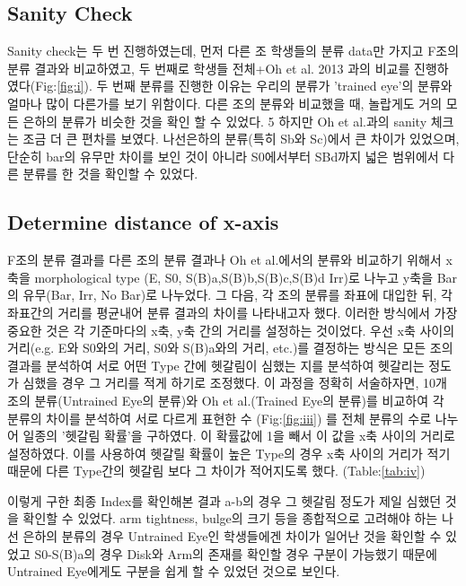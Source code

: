 \documentclass[a4paper,11pt]{article}
\begin{document}
\subsection{Sanity Check}


Sanity check는 두 번 진행하였는데, 먼저 다른 조 학생들의 분류 data만 가지고 F조의 분류 결과와 비교하였고, 두 번째로 학생들 전체+Oh et al. 2013 과의 비교를 진행하였다(Fig:\ref{fig:i}). 두 번째 분류를 진행한 이유는 우리의 분류가 'trained eye'의 분류와 얼마나 많이 다른가를 보기 위함이다. 다른 조의 분류와 비교했을 때, 놀랍게도 거의 모든 은하의 분류가 비슷한 것을 확인 할 수 있었다. 5%
하지만 Oh et al.과의 sanity 체크는 조금 더 큰 편차를 보였다. 나선은하의 분류(특히 Sb와 Sc)에서 큰 차이가 있었으며, 단순히 bar의 유무만 차이를 보인 것이 아니라 S0에서부터 SBd까지 넓은 범위에서 다른 분류를 한 것을 확인할 수 있었다.

\subsection{Determine distance of x-axis}



F조의 분류 결과를 다른 조의 분류 결과나 Oh et al.에서의 분류와 비교하기 위해서 x축을 morphological type (E, S0, S(B)a,S(B)b,S(B)c,S(B)d Irr)로 나누고 y축을 Bar의 유무(Bar, Irr, No Bar)로 나누었다. 그 다음, 각 조의 분류를 좌표에 대입한 뒤, 각 좌표간의 거리를 평균내어 분류 결과의 차이를 나타내고자 했다.
 이러한 방식에서 가장 중요한 것은 각 기준마다의 x축, y축 간의 거리를 설정하는 것이었다. 우선 x축 사이의 거리(e.g. E와 S0와의 거리, S0와 S(B)a와의 거리, etc.)를 결정하는 방식은 모든 조의 결과를 분석하여 서로 어떤 Type 간에 헷갈림이 심했는 지를 분석하여 헷갈리는 정도가 심했을 경우 그 거리를 적게 하기로 조정했다. 이 과정을 정확히 서술하자면, 10개 조의 분류(Untrained Eye의 분류)와 Oh et al.(Trained Eye의 분류)를 비교하여 각 분류의 차이를 분석하여 서로 다르게 표현한 수 (Fig:\ref{fig:iii}) 를 전체 분류의 수로 나누어 일종의 '헷갈림 확률'을 구하였다. 이 확률값에 1을 빼서 이 값을 x축 사이의 거리로 설정하였다. 이를 사용하여 헷갈릴 확률이 높은 Type의 경우 x축 사이의 거리가 적기 때문에 다른 Type간의 헷갈림 보다 그 차이가 적어지도록 했다. (Table:\ref{tab:iv})
 
 이렇게 구한 최종 Index를 확인해본 결과 a-b의 경우 그 헷갈림 정도가 제일 심했던 것을 확인할 수 있었다. arm tightness, bulge의 크기 등을 종합적으로 고려해야 하는 나선 은하의 분류의 경우 Untrained Eye인 학생들에겐 차이가 일어난 것을 확인할 수 있었고 S0-S(B)a의 경우 Disk와 Arm의 존재를 확인할 경우 구분이 가능했기 때문에 Untrained Eye에게도 구분을 쉽게 할 수 있었던 것으로 보인다.
\end{document}
